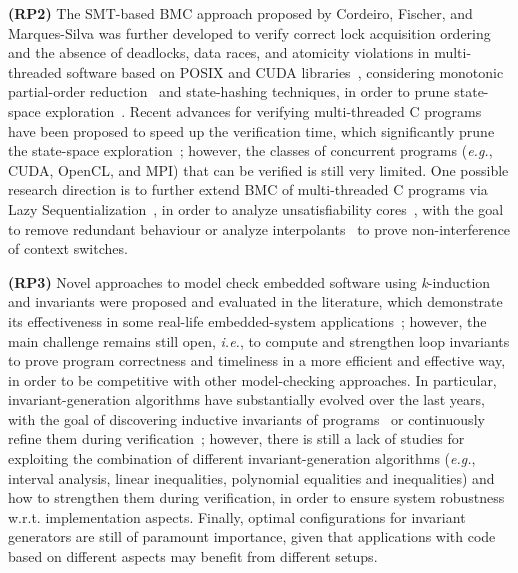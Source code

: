 \documentclass[format=acmsmall, review=false, screen=true]{acmart}
\begin{document}
\textbf{(RP2)} The SMT-based BMC approach proposed by Cordeiro, Fischer, and Marques-Silva was further developed to verify correct lock acquisition ordering and the absence of deadlocks, data races, and atomicity violations in multi-threaded software based on POSIX and CUDA libraries~\cite{CordeiroF11,Pereira17}, considering monotonic partial-order reduction~\cite{KahlonWG09} and state-hashing techniques, in order to prune state-space exploration~\cite{morse15}. Recent advances for verifying multi-threaded C programs have been proposed to speed up the verification time, which significantly prune the state-space exploration~\cite{Inverso14,civl15}; however, the classes of concurrent programs ({\it e.g.}, CUDA, OpenCL, and MPI) that can be verified is still very limited. One possible research direction is to further extend BMC of multi-threaded C programs via Lazy Sequentialization~\cite{Inverso14}, in order to analyze unsatisfiability cores~\cite{Grumberg05}, with the goal to remove redundant behaviour or analyze interpolants~\cite{McMillan11} to prove non-interference of context switches.

\textbf{(RP3)} Novel approaches to model check embedded software using \textit{k}-induction and invariants were proposed and evaluated in the literature, which demonstrate its effectiveness in some real-life embedded-system applications~\cite{Gadelha15,Brain15,Rocha15,Donaldson10,Rocha17}; however, the main challenge remains still open, {\it i.e.}, to compute and strengthen loop invariants to prove program correctness and timeliness in a more efficient and effective way, in order to be competitive with other model-checking approaches. In particular, invariant-generation algorithms have substantially evolved over the last years, with the goal of discovering inductive invariants of programs~\cite{pips:2013,Henry:2012} or continuously refine them during verification~\cite{Beyer15}; however, there is still a lack of studies for exploiting the combination of different invariant-generation algorithms ({\it e.g.}, interval analysis, linear inequalities, polynomial equalities and inequalities) and how to strengthen them during verification, in order to ensure system robustness w.r.t. implementation aspects. Finally, optimal configurations for invariant generators are still of paramount importance, given that applications with code based on different aspects may benefit from different setups.
\end{document}
